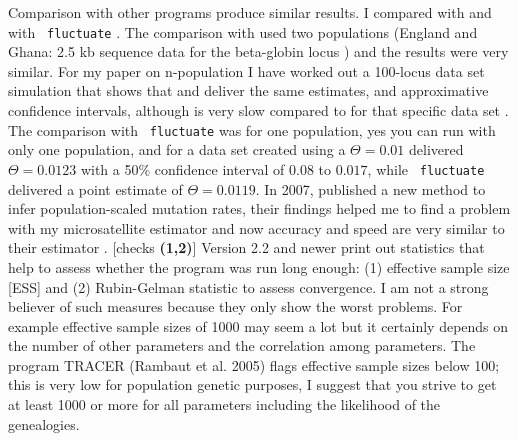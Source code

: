 Comparison with other programs produce similar results. I compared
\migrate with \genetree \citep{Bahlo:2000:IGT} and with
\texttt{ fluctuate} \citep{Kuhner1998-429}. The comparison with \genetree
used two populations (England and Ghana: 2.5 kb sequence data for the 
beta-globin locus \citep{harding1997-772}) and the results were very similar.
For my paper on n-population I have worked out a 100-locus data set simulation
that shows that \genetree and \migrate deliver the same estimates, and
approximative confidence intervals, although
\genetree is very slow compared to \migrate  for that specific
data set \citep{beerli:2001:mle}.
\vskip 0.7cm 
The comparison with \texttt{ fluctuate} was for one population, yes you can run \migrate with only one population, and for a data set
created using a $\Theta=0.01$ \migrate delivered $\Theta=0.0123$
with a 50\% confidence interval of $0.08$ to $0.017$, 
while \texttt{ fluctuate} delivered a point estimate of $\Theta=0.0119$. 
\vskip 0.7cm
In 2007, \citeauthor{roychoudhury:2007:fae} published a new method to infer population-scaled mutation rates, their findings helped me to find a problem with my microsatellite estimator and now accuracy and speed are very similar to their estimator \citep[Figure \ref{fig:msatcomp}][]{beerli:2007:eps}. 
[checks \textbf{ (1,2)}] 
\vskip 0.7cm
\migrate Version 2.2 and newer print out statistics that help to assess whether the program was run long enough: (1) effective sample size [ESS] and (2) Rubin-Gelman statistic to assess convergence. I am not a strong believer of such measures because they only show the worst problems. For example effective sample sizes of 1000 may seem a lot but it certainly depends on the number of other parameters and the correlation among parameters. The program TRACER (Rambaut et al. 2005) flags effective sample sizes below 100; this is very low for population genetic purposes, I suggest that you strive to get at least 1000 or more for all parameters including the likelihood of the genealogies.
\vskip 1cm
